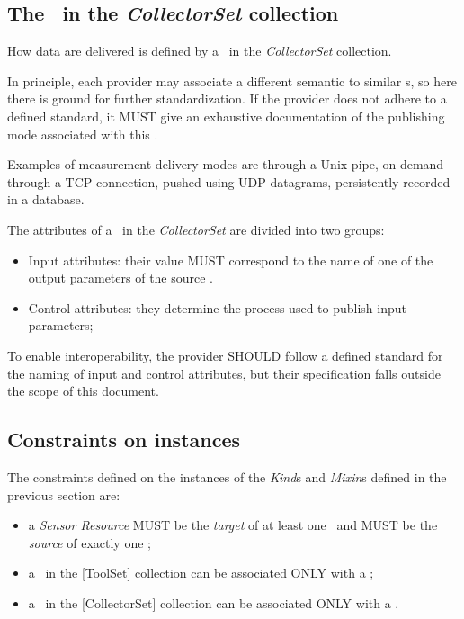 \documentclass[12pt]{article}  %
\begin{document}
{\subsection{The \mi\ in the {\em CollectorSet} collection}

How data are delivered is defined by a \mi\ in the {\em CollectorSet} collection.

In principle, each provider may associate a different semantic to similar \mi s, so here there is ground for further standardization. If the provider does not adhere to a defined standard, it MUST give an exhaustive documentation of the publishing mode associated with this \mi.

Examples of measurement delivery modes are through a Unix pipe, on demand through a TCP connection, pushed using UDP datagrams, persistently recorded in a database.

The attributes of a \mi\ in the {\em CollectorSet} are divided into two groups:

\begin{itemize}
\item Input attributes: their value MUST correspond to the name of one of the output parameters of the source \sens .
\item Control attributes: they determine the process used to publish input parameters;
\end{itemize}

To enable interoperability, the provider SHOULD follow a defined standard for the naming of input and control attributes, but their specification falls outside the scope of this document.

\subsection{Constraints on instances}

The constraints defined on the instances of the {\em Kind}s and {\em Mixin}s defined in the previous section are:

\begin{itemize}

\item a {\em Sensor Resource} MUST be the {\em target} of at least one \coll\ and MUST be the {\em source} of exactly one \coll;

\item a \mi\ in the [{ToolSet}] collection can be associated ONLY with a \coll;

\item a \mi\ in the [{CollectorSet}] collection can be associated ONLY with a \coll.


\end{itemize}}
\end{document}
